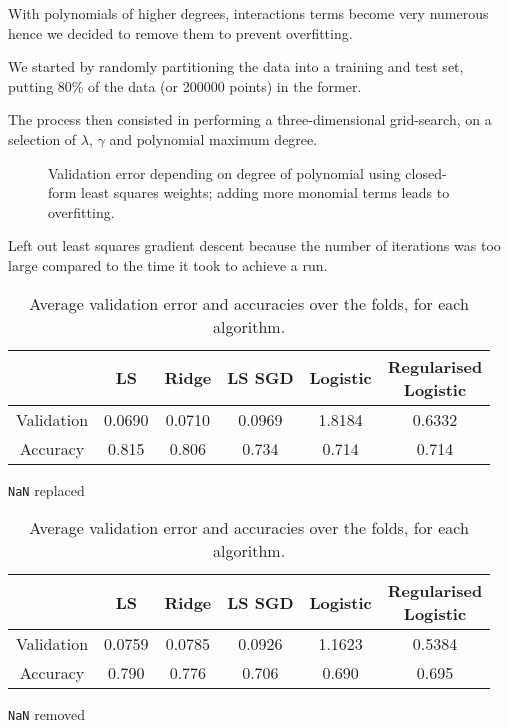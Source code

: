\documentclass[10pt,conference,compsocconf]{IEEEtran}
\begin{document}
With polynomials of higher degrees, interactions terms become very numerous hence we decided to remove them
to prevent overfitting.


We started by randomly partitioning the data into a training and test set,
putting 80\% of the data (or 200000 points) in the former.

The process then consisted in performing a three-dimensional grid-search, on a selection of $\lambda$, $\gamma$ and polynomial maximum degree.


\begin{figure}
  \centering
  
  \vspace{-3mm}
  \caption{Validation error depending on degree of polynomial using closed-form least squares weights; adding more monomial terms leads to overfitting.}
  \label{fig:overfitting}
\end{figure}

Left out least squares gradient descent because the number of iterations was too large compared to the time it took to achieve a run.



\begin{table}[h]
    \begin{subtable}[h]{0.45\textwidth}
        \centering
        \begin{tabular}{ |c|c|c|c|c|c| } 
            \hline
             & LS & Ridge & LS SGD & Logistic & \makecell{Regularised  \\ Logistic } \\
            \hline
            Validation & 0.0690 & 0.0710 & 0.0969 & 1.8184 & 0.6332 \\
            Accuracy   & 0.815 & 0.806 & 0.734 & 0.714 & 0.714 \\
            \hline
        \end{tabular}
        \caption{\texttt{NaN} replaced}
        \label{tbl:nan-replaced}
    \end{subtable}
    \hfill
    \begin{subtable}[h]{0.45\textwidth}
        \centering
            \begin{tabular}{ |c|c|c|c|c|c| } 
                \hline
                 & LS & Ridge & LS SGD & Logistic & \makecell{Regularised  \\ Logistic } \\
                \hline
                Validation & 0.0759 & 0.0785 & 0.0926 & 1.1623 & 0.5384 \\
                Accuracy   & 0.790 & 0.776 & 0.706 & 0.690 & 0.695 \\
                \hline
            \end{tabular}
        \caption{\texttt{NaN} removed}
        \label{tbl:nan-removed}
    \end{subtable}
    \caption{Average validation error and accuracies over the folds, for each algorithm.}
    \label{tbl:val-and-acc}
\end{table}
\end{document}
